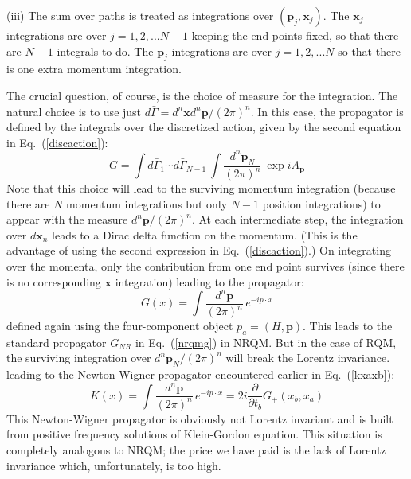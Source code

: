 \documentclass{article}
\def\eq#1{{Eq.~(\ref{#1})}}
\begin{document}
(iii) The sum over paths is treated as integrations over $(\bm{p}_j,\bm{x}_j)$. The $\bm{x}_j$ integrations are over $j=1,2,...N-1$ keeping the end points fixed, so that there are $N-1$ integrals to do. The $\bm{p}_j$ integrations are over $j=1,2,...N$ so that there is one extra momentum integration. 

The crucial question, of course, is the choice of measure for the integration. The natural choice is to use just $d\bar\Gamma=d^n \bm{x}d^n \bm{p}/(2\pi)^n$. In this case, the propagator is defined by the integrals over the discretized action, given by the second equation in \eq{discaction}:
\begin{equation}
 G=\int d \bar\Gamma_1 \cdots d \bar\Gamma_{N-1} \, \int \frac{d^n\bm{p}_N}{(2\pi)^n} \ \exp i A_{\bm p}
\end{equation} 
Note that  this choice will lead to the surviving momentum integration (because there are $N$ momentum integrations but only $N-1$ position integrations) to appear with the measure $d^n \bm{p}/(2\pi)^n$. 
At each intermediate step, the  integration over $d\bm{x}_n$ leads to a Dirac delta function on the momentum. (This is the advantage of using the second expression in \eq{discaction}.) On integrating over the momenta, only the contribution from one end point  survives (since there is no corresponding $\bm{x}$ integration) leading to the  propagator:
\begin{equation}
 G(x)=\int \frac{d^n\bm{p}}{(2\pi)^n}\, e^{-ip\cdot x} 
\end{equation} 
defined again using the four-component object $p_a=(H,\bm{p})$. This leads to the standard propagator $G_{NR}$ in \eq{nrqmg} in NRQM. 
But in the case of RQM, the surviving integration over $d^n \bm{p}_N/(2\pi)^n$ will break the Lorentz invariance. 
leading to the Newton-Wigner propagator encountered earlier in \eq{kxaxb}:
\begin{equation}
 K(x)=\int \frac{d^n\bm{p}}{(2\pi)^n}\, e^{-ip\cdot x} =  2i \frac{\partial}{\partial t_b} G_+ (x_b, x_a)
\end{equation} 
This  Newton-Wigner propagator is obviously not Lorentz invariant and is  built from positive frequency solutions of Klein-Gordon equation. This situation
is completely analogous to NRQM; the price we have paid is the lack of Lorentz invariance which, unfortunately, is  too high. 
\end{document}
